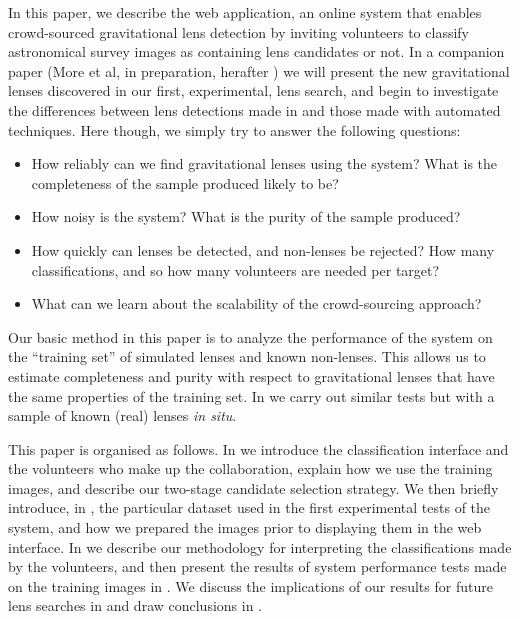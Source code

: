 \documentclass[useAMS,usenatbib,a4paper]{mn2e}
\begin{document}

In this paper, we describe the \sw web application, an online system that
enables  crowd-sourced gravitational lens detection by inviting volunteers to
classify astronomical survey images as containing lens candidates or not.  In
a companion paper (More et al, in preparation, herafter \papertwo) we will
present the new gravitational lenses discovered in our first, experimental,
lens search, and begin to investigate the differences between lens detections
made in \sw and those made with automated techniques. Here though, we simply
try to answer the following questions:

\begin{itemize}

\item How reliably can we find gravitational lenses using the \sw
system? What is the completeness of the sample produced likely to be?

\item How noisy is the system? What is the purity of the sample
produced?

\item How quickly can lenses be detected, and non-lenses be rejected?
How many classifications, and so how many volunteers are needed per target?

\item What can we learn about the scalability of the crowd-sourcing approach?

\end{itemize}

Our basic method in this paper is to analyze the performance of the \sw system
on the ``training set'' of simulated lenses and known non-lenses. This allows
us to estimate completeness and purity with respect to gravitational lenses
that have the same properties of the training set. In \papertwo we carry out
similar tests but with a sample of known (real) lenses {\it in situ}.

This paper is organised as follows.  In  we introduce the \sw
classification interface and the volunteers who make up the \sw
collaboration,  explain how we use the training images, and describe our
two-stage candidate selection strategy. We then briefly introduce, in
, the particular dataset used in the first experimental tests
of the \sw system, and how we prepared the images prior to displaying them in
the web interface. In  we describe our methodology for
interpreting the classifications made by the volunteers, and then present the
results of system performance tests  made on the training images in
.  We discuss the implications of our results for future
lens searches in  and draw conclusions in
.
\end{document}
